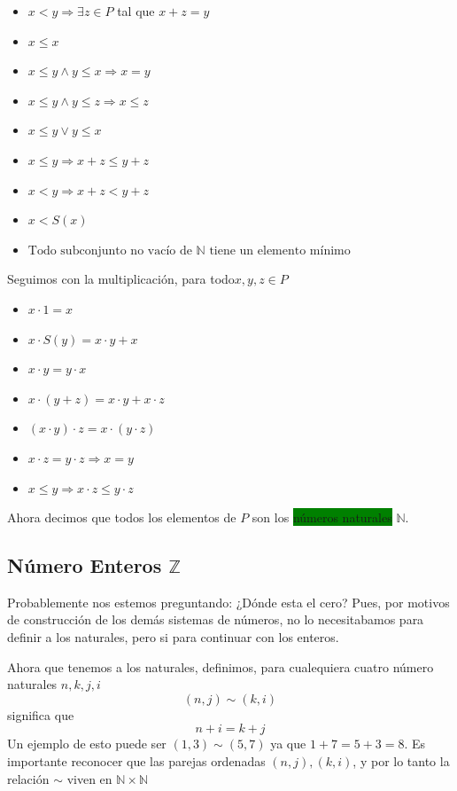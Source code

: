\documentclass[11pt]{article}
\begin{document}
\begin{itemize}
    \item $x<y \Longrightarrow \exists z\in P$ tal que $x+z=y$
    \item $x\leq x$
    \item $x\leq y \land y\leq x \Longrightarrow x=y$
    \item $x\leq y \land y\leq z \Longrightarrow x\leq z$
    \item $x\leq y \lor y\leq x$
    \item $x\leq y \Longrightarrow x+z\leq y+z$
    \item $x<y \Longrightarrow x+z<y+z$
    \item $x<S(x)$
    \item $\text{Todo subconjunto no vacío de }\mathbb{N}\text{ tiene un elemento mínimo}$
    
\end{itemize}

Seguimos con la multiplicación, para todo$x,y,z \in P$

\begin{itemize}
    \item $x\cdot 1=x$
    \item $x\cdot S(y)=x\cdot y+x$
    \item $x\cdot y=y\cdot x$
    \item $x\cdot(y+z)=x\cdot y+x\cdot z$
    \item $(x\cdot y)\cdot z=x\cdot(y\cdot z)$
    \item $x\cdot z=y\cdot z \Longrightarrow x=y$
    \item $x\leq y \Longrightarrow x\cdot z\leq y\cdot z$
\end{itemize}

Ahora decimos que todos los elementos de $P$ son los \colorbox{Green}{números naturales} $\mathbb{N}$.

\subsection{Número Enteros $\mathbb{Z}$}

Probablemente nos estemos preguntando: ¿Dónde esta el cero? Pues, por motivos de construcción de los demás sistemas de números, no lo necesitabamos para definir a los naturales, pero si para continuar con los enteros.

Ahora que tenemos a los naturales, definimos, para cualequiera cuatro número naturales $n,k,j,i$ 
\[
(n,j)\sim (k,i)
\]
significa que 
\[
n+i=k+j
\]
Un ejemplo de esto puede ser $(1,3)\sim(5,7)$ ya que $1+7=5+3=8$. Es importante reconocer que las parejas ordenadas $(n,j),(k,i)$, y por lo tanto la relación $\sim$ viven en $\mathbb{N}\times \mathbb{N}$
\end{document}
